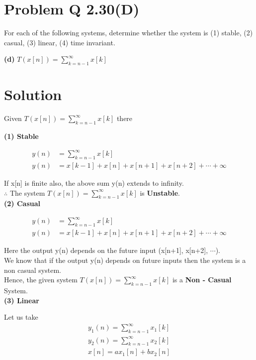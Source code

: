 \documentclass[journal,12pt,twocolumn]{IEEEtran}
\begin{document}
\section*{\textbf{Problem Q 2.30(D)}}
For each of the following systems, determine whether the system is (1) stable, (2) casual, (3) linear, (4) time invariant.

\textbf{(d)} $T(x[n]) = \sum_{k = n - 1}^{\infty} x[k]$
\section*{\textbf{Solution}}
Given $T(x[n]) = \sum_{k = n - 1}^{\infty} x[k]$
there

\textbf{(1) Stable}

\begin{align}
    y(n) &= \sum_{k = n - 1}^{\infty} x[k] \\
    y(n) &= x[k-1] + x[n] + x[n+1] + x[n+2] + \cdots + \infty
\end{align}

If x[n] is finite also, the above sum y(n) extends to infinity. \\

$\therefore$ The system $T(x[n]) = \sum_{k = n - 1}^{\infty} x[k]$ is \textbf{Unstable}. \\

\textbf{(2) Casual}

\begin{align}
    y(n) &= \sum_{k = n - 1}^{\infty} x[k] \\
    y(n) &= x[k-1] + x[n] + x[n+1] + x[n+2] + \cdots + \infty
\end{align}

Here the output y(n) depends on the future input (x[n+1], x[n+2], $\cdots$). \\

We know that if the output y(n) depends on future inputs then the system is a non casual system. \\

Hence, the given system $T(x[n]) = \sum_{k = n - 1}^{\infty} x[k]$ is a \textbf{Non - Casual} System. \\

\textbf{(3) Linear}

Let us take 
\begin{align*}
    y_1(n) = \sum_{k = n - 1}^{\infty} x_1[k] \\
    y_2(n) = \sum_{k = n - 1}^{\infty} x_2[k] \\
    x[n] = ax_1[n] + bx_2[n]
\end{align*}
\end{document}
